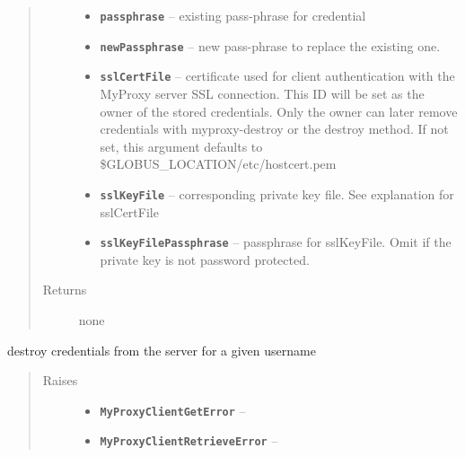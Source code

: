 \documentclass[letterpaper,10pt,english]{sphinxmanual}
\begin{document}
\begin{fulllineitems}
\begin{fulllineitems}
\begin{quote}
\begin{description}
\begin{itemize}
\item {} 
\textbf{\texttt{passphrase}} -- existing pass-phrase for credential

\item {} 
\textbf{\texttt{newPassphrase}} -- new pass-phrase to replace the existing one.

\item {} 
\textbf{\texttt{sslCertFile}} -- certificate used for client authentication with the MyProxy server SSL connection.  This ID will be set as the owner of the stored credentials.  Only the owner can later remove credentials with myproxy-destroy or the destroy method.  If not set, this argument defaults to \$GLOBUS\_LOCATION/etc/hostcert.pem

\item {} 
\textbf{\texttt{sslKeyFile}} -- corresponding private key file.  See explanation for sslCertFile

\item {} 
\textbf{\texttt{sslKeyFilePassphrase}} -- passphrase for sslKeyFile.  Omit if the private key is not password protected.

\end{itemize}

\item[{Returns}] \leavevmode
none

\end{description}\end{quote}

\end{fulllineitems}


\begin{fulllineitems}
\label{client:myproxy.client.MyProxyClient.destroy}
destroy credentials from the server for a given username
\begin{quote}\begin{description}
\item[{Raises}] \leavevmode\begin{itemize}
\item {} 
\textbf{\texttt{MyProxyClientGetError}} -- 

\item {} 
\textbf{\texttt{MyProxyClientRetrieveError}} -- 

\end{itemize}


\end{description}
\end{quote}
\end{fulllineitems}
\end{fulllineitems}
\end{document}
